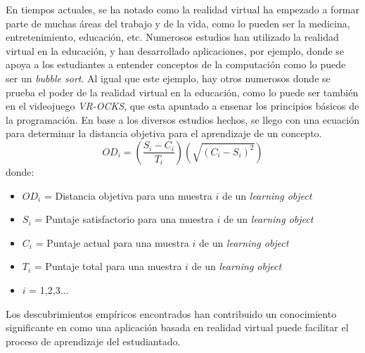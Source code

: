 En tiempos actuales, se ha notado como la realidad virtual ha empezado a formar parte de muchas áreas del trabajo y de la vida, como lo pueden ser la medicina, entretenimiento, educación, etc. Numerosos estudios han utilizado la realidad virtual en la educación, y han desarrollado aplicaciones, por ejemplo, donde se apoya a los estudiantes a entender conceptos de la computación como lo puede ser un \textit{bubble sort}. Al igual que este ejemplo, hay otros numerosos donde se prueba el poder de la realidad virtual en la educación, como lo puede ser también en el videojuego \textit{VR-OCKS}, que esta apuntado a ensenar los principios básicos de la programación. En base a los diversos estudios hechos, se llego con una ecuación para determinar la distancia objetiva para el aprendizaje de un concepto.
\begin{equation}
    OD_i = \left(\frac{S_i - C_i}{T_i}\right) \left(\sqrt{(C_i - S_i)^2}\right) 
   \label{eq:distancia-objetiva}
\end{equation}
donde:
\begin{itemize}
   \item $ OD_i $ = Distancia objetiva para una muestra $i$ de un \textit{learning object}
   \item $ S_i $ = Puntaje satisfactorio para una muestra $i$ de un \textit{learning object}
   \item $ C_i $ = Puntaje actual para una muestra $i$ de un \textit{learning object}
   \item $ T_i $ = Puntaje total para una muestra $i$ de un \textit{learning object}
   \item $ i $ = 1,2,3...
\end{itemize}
Los descubrimientos empíricos encontrados han contribuido un conocimiento significante en como una aplicación basada en realidad virtual puede facilitar el proceso de aprendizaje del estudiantado. \parencite{OYELERE2023100016}
